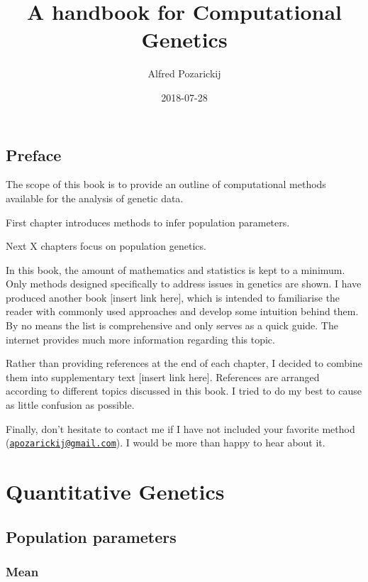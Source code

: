 \documentclass[]{book}
\title{A handbook for Computational Genetics}
\author{Alfred Pozarickij}
\date{2018-07-28}
\theoremstyle{definition}
\theoremstyle{definition}
\theoremstyle{definition}
\theoremstyle{remark}
\begin{document}
\maketitle

{
\setcounter{tocdepth}{1}
\tableofcontents
}
\chapter*{Preface}\label{preface}

The scope of this book is to provide an outline of computational methods
available for the analysis of genetic data.

First chapter introduces methods to infer population parameters.

Next X chapters focus on population genetics.

In this book, the amount of mathematics and statistics is kept to a
minimum. Only methods designed specifically to address issues in
genetics are shown. I have produced another book {[}insert link here{]},
which is intended to familiarise the reader with commonly used
approaches and develop some intuition behind them. By no means the list
is comprehensive and only serves as a quick guide. The internet provides
much more information regarding this topic.

Rather than providing references at the end of each chapter, I decided
to combine them into supplementary text {[}insert link here{]}.
References are arranged according to different topics discussed in this
book. I tried to do my best to cause as little confusion as possible.

Finally, don't hesitate to contact me if I have not included your
favorite method
(\href{mailto:apozarickij@gmail.com}{\nolinkurl{apozarickij@gmail.com}}).
I would be more than happy to hear about it.

\part{Quantitative
Genetics}\label{part-quantitative-genetics}

\chapter{Population parameters}\label{population-parameters}

\section{Mean}\label{mean}
\end{document}
